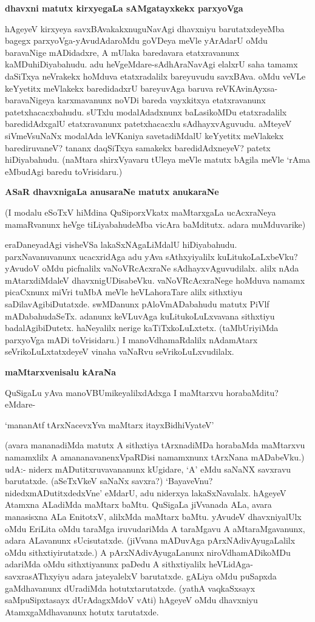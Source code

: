 \textbf{dhavxni matutx kirxyegaLa sAMgatayxkekx parxyoVga}
  
  hAgeyeV kirxyeya savxBAvakakxnuguNavAgi dhavxniyu barutatxdeyeMba 
  bagegx parxyoVga-yAvudAdaroMdu goVDeya meVle yArAdarU oMdu baravaNige 
  mADidadxre, A mUlaka baredavara etatxravanunx kaMDuhiDiyabahudu. adu heVgeMdare-sAdhAraNavAgi elalxrU saha tamamx daSiTxya neVrakekx hoMduva etatxradalilx bareyuvudu savxBAva. oMdu veVLe keYyetitx meVlakekx baredidadxrU bareyuvAga baruva reVKAvinAyxsa-baravaNigeya karxmavanunx noVDi bareda vayxkitxya etatxravanunx patetxhacacxbahudu. sUTxlu modalAdadxnunx baLasikoMDu etatxradalilx baredidAdxgalU etatxravanunx patetxhacacxlu sAdhayxvAguvudu. aMteyeV siVmeVsuNaNx modalAda leVKaniya savetadiMdalU keYyetitx meVlakekx barediruvaneV? tananx daqSiTxya samakekx baredidAdxneyeV? patetx hiDiyabahudu. (naMtara shirxVyavaru tUleya meVle matutx bAgila meVle `rAma eMbudAgi baredu toVrisidaru.)
  
  \textbf{ASaR dhavxnigaLa anusaraNe matutx anukaraNe}
  
  (I modalu eSoTxV hiMdina QuSiporxVkatx maMtarxgaLa ucAcxraNeya mamaRvanunx heVge tiLiyabahudeMba vicAra baMditutx. adara muMduvarike) 
  
  eraDaneyadAgi visheVSa lakaSxNAgaLiMdalU hiDiyabahudu. parxNavanuvanunx ucacxridAga adu yAva sAthxyiyalilx kuLitukoLaLxbeVku? yAvudoV oMdu picfnalilx vaNoVRcAcxraNe sAdhayxvAguvudilalx. alilx nAda mAtarxdiMdaleV dhavxnigUDisabeVku. vaNoVRcAcxraNege hoMduva namamx picaCxnunx miVri tuMbA meVle heVLahoraTare alilx sithxtiyu saDilavAgibiDutatxde. swMDanunx pAloVmADabahudu matutx PiVlf mADabahudaSeTx. adanunx keVLuvAga kuLitukoLuLxvavana sithxtiyu badalAgibiDutetx. haNeyalilx nerige kaTiTxkoLuLxtetx. (taMbUriyiMda parxyoVga mADi toVrisidaru.) I manoVdhamaRdalilx nAdamAtarx seVrikoLuLxtatxdeyeV vinaha vaNaRvu seVrikoLuLxvudilalx.
  
  \textbf{maMtarxvenisalu kAraNa}
  
  QuSigaLu yAva manoVBUmikeyalilxdAdxga I maMtarxvu horabaMditu? eMdare-
 
 \begin{shloka}
 `mananAtf tArxNacevxYva maMtarx itayxBidhiVyateV'
 \end{shloka}

(avara mananadiMda matutx A sithxtiya tArxnadiMDa horabaMda maMtarxvu namamxlilx A amananavanenxVpaRDisi namamxnunx tArxNana mADabeVku.) udA:- niderx
mADutitxruvavananunx kUgidare, `A' eMdu saNaNX savxravu barutatxde. (aSeTxVkeV saNaNx savxra?) `BayaveVnu? nidedxmADutitxdedxVne' eMdarU, adu niderxya lakaSxNavalalx. hAgeyeV Atamxna ALadiMda maMtarx baMtu. QuSigaLa jiVvanada ALa, avara manasisxna ALa EnitotxV, alilxMda maMtarx baMtu. yAvudeV dhavxniyalUlx oMdu EriLita oMdu taraMga iruvudariMda A taraMgavu A aMtaraMgavanunx, adara ALavanunx sUcisutatxde. (jiVvana mADuvAga pArxNAdivAyugaLalilx oMdu sithxtiyirutatxde.) A pArxNAdivAyugaLanunx niroVdhamADikoMDu adariMda oMdu sithxtiyanunx paDedu A sithxtiyalilx heVLidAga-savxrasAThxyiyu adara jateyalelxV barutatxde. gALiya oMdu puSapxda gaMdhavanunx dUradiMda hotutxtarutatxde. (yathA vaqkaSxsayx saMpuSipxtasayx dUrAdagxMdoV vAti) hAgeyeV oMdu dhavxniyu AtamxgaMdhavanunx hotutx tarutatxde.

